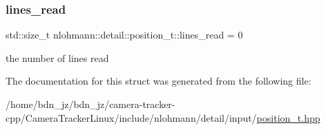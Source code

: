 \subsubsection{\texorpdfstring{lines\+\_\+read}{lines\_read}}
{\footnotesize\ttfamily std\+::size\+\_\+t nlohmann\+::detail\+::position\+\_\+t\+::lines\+\_\+read = 0}



the number of lines read 



The documentation for this struct was generated from the following file\+:\begin{DoxyCompactItemize}
\item 
/home/bdn\+\_\+jz/bdn\+\_\+jz/camera-\/tracker-\/cpp/\+Camera\+Tracker\+Linux/include/nlohmann/detail/input/\hyperlink{position__t_8hpp}{position\+\_\+t.\+hpp}\end{DoxyCompactItemize}
